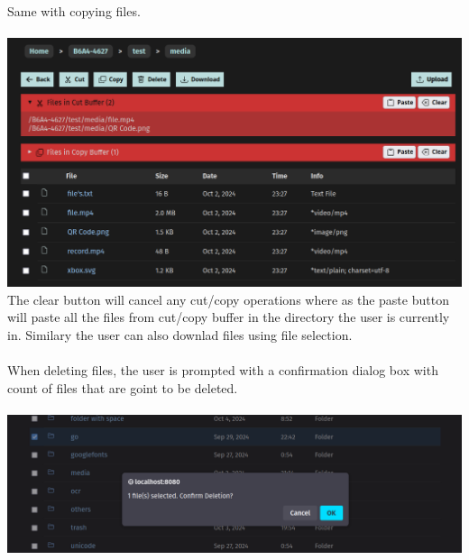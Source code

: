 \documentclass[12pt]{article}
\begin{document}
\clearpage
Same with copying files. \\ \\
\includegraphics[width=\linewidth]{ss/7.cm-cut-copy.png} \\

The clear button will cancel any cut/copy operations where as the paste button will paste all the files from cut/copy buffer in the directory the user is currently in. Similary the user can also downlad files using file selection. \\ \\

When deleting files, the user is prompted with a confirmation dialog box with count of files that are goint to be deleted. \\ \\
\includegraphics[width=\linewidth]{ss/8.cm-delete-prompt.png}
\end{document}
